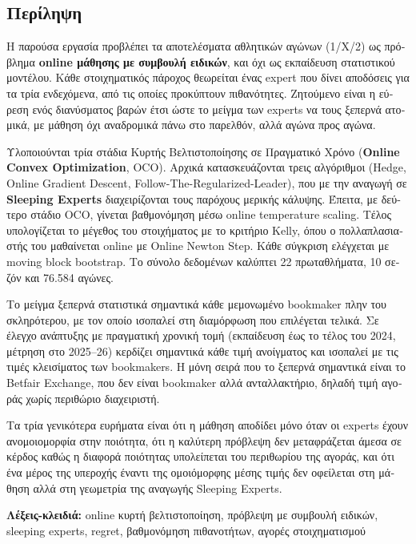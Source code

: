 \documentclass[12pt,a4paper,oneside]{report}
\renewcommand{\_}{\oldunderscore\allowbreak}
\theoremstyle{definition}
\theoremstyle{plain}
\theoremstyle{remark}
\begin{document}
\cleardoublepage

\begin{greek}
\chapter*{Περίληψη}

Η παρούσα εργασία προβλέπει τα αποτελέσματα αθλητικών αγώνων (1/Χ/2) ως πρόβλημα
\textbf{online μάθησης με συμβουλή ειδικών}, και όχι ως εκπαίδευση στατιστικού μοντέλου.
Κάθε στοιχηματικός πάροχος θεωρείται ένας expert που δίνει αποδόσεις για τα τρία ενδεχόμενα,
από τις οποίες προκύπτουν πιθανότητες. Ζητούμενο είναι η εύρεση ενός διανύσματος βαρών έτσι
ώστε το μείγμα των experts να τους ξεπερνά ατομικά, με μάθηση όχι αναδρομικά πάνω στο
παρελθόν, αλλά αγώνα προς αγώνα.

Υλοποιούνται τρία στάδια Κυρτής Βελτιστοποίησης σε Πραγματικό Χρόνο (\textbf{Online Convex
Optimization}, OCO). Αρχικά κατασκευάζονται τρεις αλγόριθμοι (Hedge, Online Gradient Descent,
Follow-The-Regularized-Leader), που με την αναγωγή σε \textbf{Sleeping Experts} διαχειρίζονται
τους παρόχους μερικής κάλυψης. Έπειτα, με δεύτερο στάδιο OCO, γίνεται βαθμονόμηση μέσω online
temperature scaling. Τέλος υπολογίζεται το μέγεθος του στοιχήματος με το κριτήριο Kelly, όπου
ο πολλαπλασιαστής του μαθαίνεται online με Online Newton Step. Κάθε σύγκριση ελέγχεται με
moving block bootstrap. Το σύνολο δεδομένων καλύπτει 22 πρωταθλήματα, 10 σεζόν και 76.584
αγώνες.

Το μείγμα ξεπερνά στατιστικά σημαντικά κάθε μεμονωμένο bookmaker πλην του σκληρότερου, με
τον οποίο ισοπαλεί στη διαμόρφωση που επιλέγεται τελικά. Σε έλεγχο ανάπτυξης με πραγματική
χρονική τομή (εκπαίδευση έως το τέλος του 2024, μέτρηση στο 2025--26) κερδίζει σημαντικά κάθε
τιμή ανοίγματος και ισοπαλεί με τις τιμές κλεισίματος των bookmakers. Η μόνη σειρά που το
ξεπερνά σημαντικά είναι το Betfair Exchange, που δεν είναι bookmaker αλλά ανταλλακτήριο,
δηλαδή τιμή αγοράς χωρίς περιθώριο διαχειριστή.

Τα τρία γενικότερα ευρήματα είναι ότι η μάθηση αποδίδει μόνο όταν οι experts έχουν
ανομοιομορφία στην ποιότητα, ότι η καλύτερη πρόβλεψη δεν μεταφράζεται άμεσα σε κέρδος καθώς
η διαφορά ποιότητας υπολείπεται του περιθωρίου της αγοράς, και ότι ένα μέρος της υπεροχής
έναντι της ομοιόμορφης μέσης τιμής δεν οφείλεται στη μάθηση αλλά στη γεωμετρία της αναγωγής
Sleeping Experts.

\vspace{1em}
\noindent\textbf{Λέξεις-κλειδιά:} online κυρτή βελτιστοποίηση, πρόβλεψη με συμβουλή ειδικών,
sleeping experts, regret, βαθμονόμηση πιθανοτήτων, αγορές στοιχηματισμού
\end{greek}
\tableofcontents
\cleardoublepage
\end{document}
